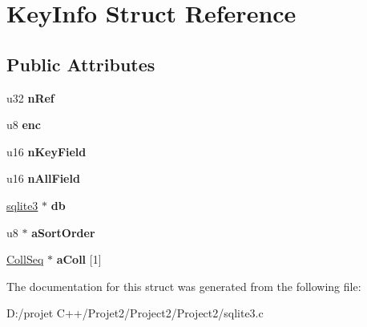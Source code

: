 \hypertarget{struct_key_info}{}\section{Key\+Info Struct Reference}
\label{struct_key_info}
\subsection*{Public Attributes}
\begin{DoxyCompactItemize}
\item 
\mbox{\label{struct_key_info_a4f6162c8d1ecc9e3c7471571e8918972}} 
u32 {\bfseries n\+Ref}
\item 
\mbox{\label{struct_key_info_a37972825f9a148668e979be12465e832}} 
u8 {\bfseries enc}
\item 
\mbox{\label{struct_key_info_a44bf8a06d747dc506b54c3ce6c6cc6d1}} 
u16 {\bfseries n\+Key\+Field}
\item 
\mbox{\label{struct_key_info_ac9860ac498758b52093ea50ccf150ec4}} 
u16 {\bfseries n\+All\+Field}
\item 
\mbox{\label{struct_key_info_af2e7a3a411f5ca1ccf6de77d320b59db}} 
\mbox{\hyperlink{structsqlite3}{sqlite3}} $\ast$ {\bfseries db}
\item 
\mbox{\label{struct_key_info_ac5fe4bd0172a1f11f41f678528a7b21e}} 
u8 $\ast$ {\bfseries a\+Sort\+Order}
\item 
\mbox{\label{struct_key_info_ad43aa024fca5a065e75d8e24b231adcb}} 
\mbox{\hyperlink{struct_coll_seq}{Coll\+Seq}} $\ast$ {\bfseries a\+Coll} \mbox{[}1\mbox{]}
\end{DoxyCompactItemize}


The documentation for this struct was generated from the following file\+:\begin{DoxyCompactItemize}
\item 
D\+:/projet C++/\+Projet2/\+Project2/\+Project2/sqlite3.\+c\end{DoxyCompactItemize}
